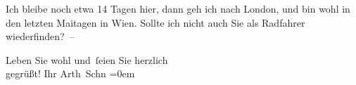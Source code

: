 \pstart
           Ich bleibe noch etwa 14 Tagen hier, dann geh ich nach London, und bin wohl in den letzten Maitagen in Wien. Sollte ich nicht auch Sie als Radfahrer
               wiederfinden? –\pend
           
\pstart
           Leben Sie wohl und ſeien Sie herzlich{\\[\baselineskip]} gegrüßt! Ihr \spacefill\mbox{Arth
                  Schn}\pend
           \leftskip=0em{}\endnumbering{}
\begin{anhang}
\end{anhang}\newcommand{\dateiname}{L04111}\newcommand{\titel}{Arthur Schnitzler an Gustav Schwarzkopf, 9. 5. 1897}\newcommand{\editorInnen}{Herausgegeben von Jahnke, SelmaMüller, Martin Anton}
